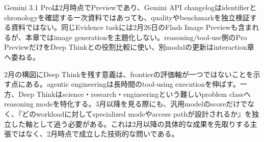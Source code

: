 \begin{claimboundary}
Gemini 3.1 Proは2月時点でPreviewであり、Gemini API changelogはidentifierとchronologyを確認する一次資料ではあっても、qualityやbenchmarkを独立検証する資料ではない。同じEvidence taskには2月26日のFlash Image Previewも含まれるが、本章ではimage generationを主題化しない。reasoning/tool-use側のPro PreviewだけをDeep Thinkとの役割比較に使い、別modalの更新はinteraction章へ委ねる。\autocite{src-a24fd97eb3d0}
\end{claimboundary}

2月の構図にDeep Thinkを残す意義は、frontierの評価軸が一つではないことを示す点にある。agentic engineeringは長時間のtool-using executionを伸ばす。一方、Deep Thinkはscience・research・engineeringという難しいproblem classへreasoning modeを特化する。3月以降を見る際にも、汎用modelのscoreだけでなく、『どのworkloadに対してspecialized modeやaccess pathが設計されるか』を独立した軸として追う必要がある。これは2月以降の具体的な成果を先取りする主張ではなく、2月時点で成立した技術的な問いである。\autocite{src-a24fd97eb3d0,src-dd5d9b8662f3}
